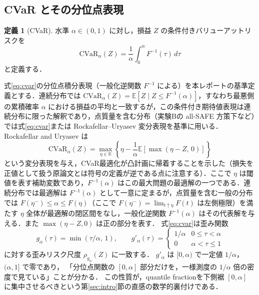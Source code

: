 \documentclass[a4paper,10pt]{jsarticle}
\theoremstyle{definition}
\newtheorem{definition}{定義}[section]
\newcommand{\CVaR}{\mathrm{CVaR}}
\newcommand{\Finv}{F^{-1}}
\newcommand{\R}{\mathbb{R}}
\newcommand{\E}{\mathbb{E}}
\begin{document}
\subsection{CVaR とその分位点表現}
\label{subsec:cvar}
\begin{definition}[CVaR]
水準 $\alpha\in(0,1)$ に対し，損益 $Z$ の条件付きバリューアットリスクを
\begin{equation}
  \CVaR_\alpha(Z)=\frac1\alpha\int_0^\alpha\Finv(\tau)\,d\tau
  \label{eq:cvar}
\end{equation}
と定義する．
\end{definition}
式\eqref{eq:cvar}の分位点積分表現（一般化逆関数 $\Finv$ による）を本レポートの基準定義とする．連続分布では $\CVaR_\alpha(Z)=\E[Z\mid Z\le\Finv(\alpha)]$，すなわち最悪側の累積確率 $\alpha$ における損益の平均と一致するが，この条件付き期待値表現は連続分布に限った解釈であり，点質量を含む分布（実験Bの all-SAFE 方策下など）では式\eqref{eq:cvar}または Rockafellar--Uryasev 変分表現を基準に用いる．
Rockafellar and Uryasev \cite{rockafellar2000cvar} は
\begin{equation}
  \CVaR_\alpha(Z)=\max_{\eta\in\R}\left\{\eta-\frac1\alpha\E\left[\max(\eta-Z,\,0)\right]\right\}
\end{equation}
という変分表現を与え，CVaR最適化が凸計画に帰着することを示した（損失を正値として扱う原論文とは符号の定義が逆である点に注意する）．ここで $\eta$ は閾値を表す補助変数であり，$\Finv(\alpha)$ はこの最大問題の最適解の一つである．連続分布では最適解は $\Finv(\alpha)$ として一意に定まるが，点質量を含む一般の分布では $F(\eta^-)\le\alpha\le F(\eta)$（ここで $F(\eta^-)=\lim_{t\uparrow\eta}F(t)$ は左側極限）を満たす $\eta$ 全体が最適解の閉区間をなし，一般化逆関数 $\Finv(\alpha)$ はその代表解を与える．また $\max(\eta-Z,0)$ は正の部分を表す．
式\eqref{eq:cvar}は歪み関数
\begin{equation}
  g_\alpha(\tau)=\min\left(\tau/\alpha,\,1\right),\qquad
  g'_\alpha(\tau)=\begin{cases}1/\alpha & 0\le\tau<\alpha\\ 0 & \alpha<\tau\le 1\end{cases}
  \label{eq:g-cvar}
\end{equation}
に対する歪みリスク尺度 $\rho_{g_\alpha}(Z)$ に一致する．
$g'_\alpha$ は $[0,\alpha)$ で一定値 $1/\alpha$，$(\alpha,1]$ で零であり，
「分位点関数の $[0,\alpha]$ 部分だけを，一様測度の $1/\alpha$ 倍の密度で見ている」ことが分かる．
この性質が，quantile fractionを下側裾 $[0,\alpha]$ に集中させるべきという第\ref{sec:intro}節の直感の数学的裏付けである．
\end{document}
